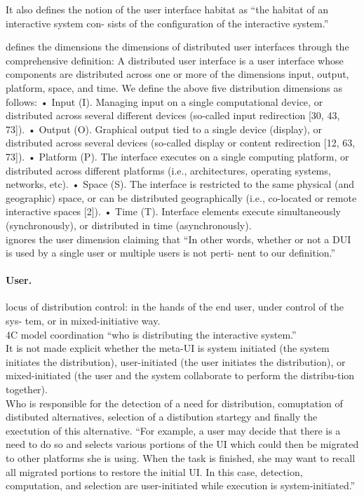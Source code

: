 \cite{demeure20084c} It also defines the notion of the user interface habitat as
``the habitat of an interactive system con- sists of the configuration of the interactive system.''

\cite{elmqvist2011distributed} defines the dimensions the dimensions of
distributed user interfaces through the comprehensive definition: A distributed
user interface is a user interface whose components are distributed across one or more of the dimensions input, output, platform, space, and time.
We define the above five distribution dimensions as follows:
• Input (I). Managing input on a single computational device, or distributed across several different devices (so-called input redirection [30, 43, 73]).
• Output (O). Graphical output tied to a single device (display), or distributed across several devices (so-called display or content redirection [12, 63, 73]).
• Platform (P). The interface executes on a single computing platform, or distributed across different platforms (i.e., architectures, operating systems, networks, etc).
• Space (S). The interface is restricted to the same physical (and geographic) space, or can be distributed geographically (i.e., co-located or remote interactive spaces [2]).
• Time (T). Interface elements execute simultaneously (synchronously), or
distributed in time (asynchronously).\\

\cite{elmqvist2011distributed} ignores the user dimension claiming that ``In
other words, whether or not a DUI is used by a single user or multiple users is
not perti- nent to our definition.''

\paragraph{User.}
\cite{vanderdonckt2010distributed}locus of distribution control: in the hands of
the end user, under control of the sys- tem, or in mixed-initiative way.\\

\cite{demeure20084c} 4C model coordination ``who is distributing the interactive
system.''\\It is not made explicit whether the meta-UI is system initiated (the
system initiates the distribution), user-initiated (the user initiates the
distribution), or mixed-initiated (the user and the system collaborate to
perform the distribu-tion together).\\
Who is responsible for the detection of a need for distribution, comuptation of
distibuted alternatives, selection of a distibution startegy and
finally the exectution of this alternative. ``For example, a user may decide
that there is a need to do so and selects various portions of the UI which could
then be migrated to other platforms she is using. When the task is finished, she
may want to recall all migrated portions to restore the initial UI. In this
case, detection, computation, and selection are user-initiated while execution
is system-initiated.'' \cite{demeure20084c}\\

